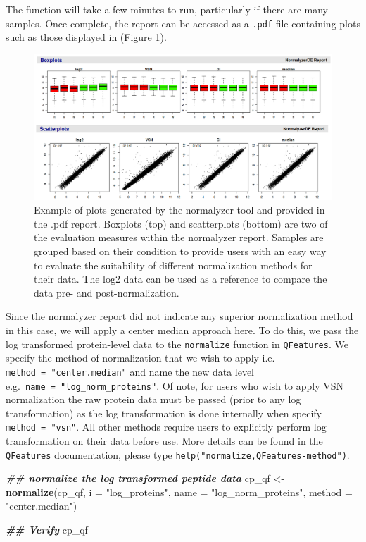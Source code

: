 \documentclass[9pt,a4paper,]{extarticle}
\newenvironment{Shaded}{\begin{snugshade}}{\end{snugshade}}
\newcommand{\AttributeTok}[1]{\textcolor[rgb]{0.13,0.29,0.53}{#1}}
\newcommand{\DocumentationTok}[1]{\textcolor[rgb]{0.56,0.35,0.01}{\textbf{\textit{#1}}}}
\newcommand{\FunctionTok}[1]{\textcolor[rgb]{0.13,0.29,0.53}{\textbf{#1}}}
\newcommand{\NormalTok}[1]{#1}
\newcommand{\OtherTok}[1]{\textcolor[rgb]{0.56,0.35,0.01}{#1}}
\newcommand{\StringTok}[1]{\textcolor[rgb]{0.31,0.60,0.02}{#1}}
\begin{document}
The function will take a few minutes to run, particularly if there are many
samples. Once complete, the report can be accessed as a \texttt{.pdf} file containing
plots such as those displayed in (Figure \ref{fig:normalyzer-figure}).

\begin{figure}

{\centering \includegraphics[width=0.85\linewidth]{Images/normalyzerreport} 

}

\caption{Example of plots generated by the normalyzer tool and provided in the .pdf report. Boxplots (top) and scatterplots (bottom) are two of the evaluation measures within the normalyzer report. Samples are grouped based on their condition to provide users with an easy way to evaluate the suitability of different normalization methods for their data. The log2 data can be used as a reference to compare the data pre- and post-normalization.}\label{fig:normalyzer-figure}
\end{figure}

Since the normalyzer report did not indicate any superior normalization method
in this case, we will apply a center median approach here. To do this, we pass
the log transformed protein-level data to the \texttt{normalize} function in
\texttt{QFeatures}. We specify the method of normalization that we wish to apply i.e.
\texttt{method\ =\ "center.median"} and name the new data level e.g.~\texttt{name\ =\ "log\_norm\_proteins"}.
Of note, for users who wish to apply VSN normalization the raw protein data must
be passed (prior to any log transformation) as the log transformation is done
internally when specify \texttt{method\ =\ "vsn"}. All other methods require users to
explicitly perform log transformation on their data before use. More details
can be found in the \texttt{QFeatures} documentation, please type \texttt{help("normalize,QFeatures-method")}.

\begin{Shaded}
\begin{Highlighting}[]
\DocumentationTok{\#\# normalize the log transformed peptide data}
\NormalTok{cp\_qf }\OtherTok{\textless{}{-}} \FunctionTok{normalize}\NormalTok{(cp\_qf,}
                   \AttributeTok{i =} \StringTok{"log\_proteins"}\NormalTok{,}
                   \AttributeTok{name =} \StringTok{"log\_norm\_proteins"}\NormalTok{,}
                   \AttributeTok{method =} \StringTok{"center.median"}\NormalTok{)}

\DocumentationTok{\#\# Verify}
\NormalTok{cp\_qf}
\end{Highlighting}
\end{Shaded}
\end{document}
